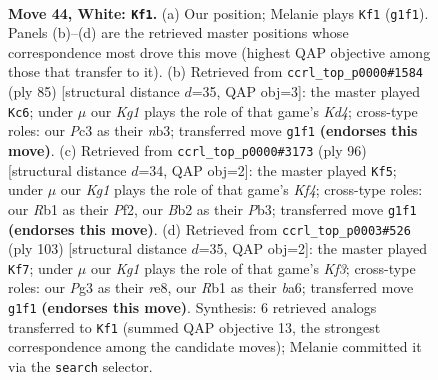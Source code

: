 \documentclass[11pt]{article}
\begin{document}
\clearpage

\begin{figure}[p]\centering
\begin{subfigure}{0.46\textwidth}\centering
\resizebox{\linewidth}{!}{%
\newchessgame
\chessboard[
  setfen={6k1/3n4/4r3/8/p1p5/P1P3Pp/1BP4P/1R4K1 w - - 5 44},
  showmover=false,
  pgfstyle=straightmove, color=movearrow, markmove={g1-f1}
]}
\caption{}
\end{subfigure}\hfill
\begin{subfigure}{0.46\textwidth}\centering
\resizebox{\linewidth}{!}{%
\newchessgame
\chessboard[
  setfen={3b4/1p1r4/p4p2/3k3p/P4P1K/1N6/2P5/3R4 b - - 7 43},
  showmover=false,
  pgfstyle=straightmove, color=movearrow, markmove={d5-c6}
]}
\caption{}
\end{subfigure}
\\[4pt]
\begin{subfigure}{0.46\textwidth}\centering
\resizebox{\linewidth}{!}{%
\newchessgame
\chessboard[
  setfen={8/2pn1k2/3p3p/p2P4/1p2BKP1/1P6/P4P2/8 w - - 1 49},
  showmover=false,
  pgfstyle=straightmove, color=movearrow, markmove={f4-f5}
]}
\caption{}
\end{subfigure}\hfill
\begin{subfigure}{0.46\textwidth}\centering
\resizebox{\linewidth}{!}{%
\newchessgame
\chessboard[
  setfen={4R3/2r4p/Bp3k2/2b2p1P/P1P2P2/5K2/8/8 b - - 24 52},
  showmover=false,
  pgfstyle=straightmove, color=movearrow, markmove={f6-f7}
]}
\caption{}
\end{subfigure}
\caption{\textbf{Move 44, White: \texttt{Kf1}.} (a) Our position; Melanie plays \texttt{Kf1} (\texttt{g1f1}). Panels (b)--(d) are the retrieved master positions whose correspondence most drove this move (highest QAP objective among those that transfer to it). (b) Retrieved from \texttt{ccrl\_top\_p0000\#1584} (ply 85) [structural distance $d$=35, QAP obj=3]: the master played \texttt{Kc6}; under $\mu$ our \emph{Kg1} plays the role of that game's \emph{Kd4}; cross-type roles: our \emph{P}c3 as their \emph{n}b3; transferred move \texttt{g1f1} \textbf{(endorses this move)}. (c) Retrieved from \texttt{ccrl\_top\_p0000\#3173} (ply 96) [structural distance $d$=34, QAP obj=2]: the master played \texttt{Kf5}; under $\mu$ our \emph{Kg1} plays the role of that game's \emph{Kf4}; cross-type roles: our \emph{R}b1 as their \emph{P}f2, our \emph{B}b2 as their \emph{P}b3; transferred move \texttt{g1f1} \textbf{(endorses this move)}. (d) Retrieved from \texttt{ccrl\_top\_p0003\#526} (ply 103) [structural distance $d$=35, QAP obj=2]: the master played \texttt{Kf7}; under $\mu$ our \emph{Kg1} plays the role of that game's \emph{Kf3}; cross-type roles: our \emph{P}g3 as their \emph{r}e8, our \emph{R}b1 as their \emph{b}a6; transferred move \texttt{g1f1} \textbf{(endorses this move)}. Synthesis: 6 retrieved analogs transferred to \texttt{Kf1} (summed QAP objective 13, the strongest correspondence among the candidate moves); Melanie committed it via the \texttt{search} selector.}
\label{fig:thought-m86}
\end{figure}
\end{document}
